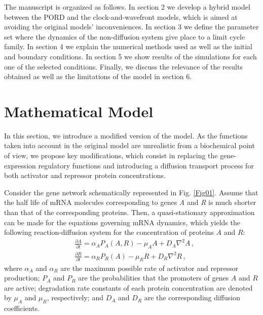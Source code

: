 \documentclass[11pt]{article}
\begin{document}
	The manuscript is organized as follows. In section 2 we develop a hybrid
	model between the PORD and the clock-and-wavefront models, 
	which is aimed at avoiding the original models' inconveniences. In section 3 we 
	define the parameter set where the dynamics of the non-diffusion system give place 
	to a limit cycle family. In section 4 we explain the numerical methods used as 
	well as the initial and boundary conditions. In section 5 we show results of the
	simulations for each one of the selected conditions. Finally, we discuss the 
	relevance of the results obtained as well as the limitations of the model in 
	section 6.
	
	\section{Mathematical Model}
	\label{model}
	
	In this section, we introduce a modified version of the
	\citeauthor{Cotterell2015} model. As the functions taken into account in the
	original model are unrealistic from a biochemical point of view, we propose key
	modifications, which consist in replacing the gene-expression regulatory
	functions and introducing a diffusion transport process for both activator and
	repressor protein concentrations.
	
	Consider the gene network schematically represented in Fig. \ref{Fig01}. Assume
	that the half life of mRNA molecules corresponding to genes \textit{A} and
	\textit{R} is much shorter than that of the corresponding proteins. Then, a
	quasi-stationary approximation can be made for the equations governing mRNA
	dynamics, which yields the following reaction-diffusion system for the concentration of
	proteins $A$ and $R$:
	\begin{subequations}\label{eq012}
		\begin{flalign}
		& \frac{\partial A}{\partial t} = \alpha_A P_A (A, R) - \mu_A A + D_A \nabla^2 A\,,
		\label{eq01} \\
		& \frac{\partial R}{\partial t} = \alpha_R P_R (A) - \mu_R R + D_R \nabla^2 R\,,
		\label{eq02}
		\end{flalign}
	\end{subequations}
	where $\alpha_A$ and $\alpha_R$ are the maximum possible rate of activator and
	repressor production; $P_A$ and $P_B$ are the probabilities that the promoters
	of genes $A$ and $R$ are active; degradation rate constants of each protein
	concentration are denoted by $\mu_A$ and $\mu_R$, respectively; and $D_A$ and
	$D_R$ are the corresponding diffusion coefficients.
	
\end{document}
